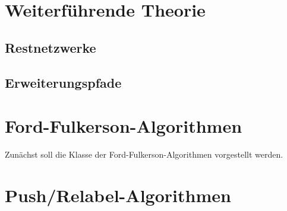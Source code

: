 \documentclass[12pt,a4paper,titlepage,onecolumn,ngerman,draft]{scrartcl}
\newcommand{\ff}{Ford-Fulkerson}
\newcommand{\pr}{Push/Relabel}
\begin{document}
\section{Weiterführende Theorie}
\subsection{Restnetzwerke}
\subsection{Erweiterungspfade}

\section{\ff -Algorithmen}
Zunächst soll die Klasse der \ff -Algorithmen vorgestellt werden.

\section{\pr -Algorithmen}

\newpage
{}

\end{document}
